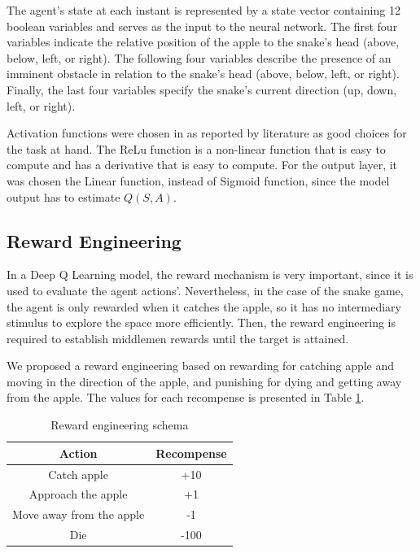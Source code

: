\documentclass[conference]{IEEEtran}
\begin{document}
The agent's state at each instant is represented by a state vector containing 12 boolean variables and serves as the input to the neural network. The first four variables indicate the relative position of the apple to the snake's head (above, below, left, or right). The following four variables describe the presence of an imminent obstacle in relation to the snake's head (above, below, left, or right). Finally, the last four variables specify the snake's current direction (up, down, left, or right). 

Activation functions were chosen in as reported by literature as good choices for the task at hand. The ReLu function is a non-linear function that is easy to compute and has a derivative that is easy to compute. For the output layer, it was chosen the Linear function, instead of Sigmoid function, since the model output has to estimate $Q(S,A)$.


\subsection{Reward Engineering}

In a Deep Q Learning model, the reward mechanism is very important, since it is used to evaluate the agent actions'. Nevertheless, in the case of the snake game, the agent is only rewarded when it catches the apple, so it has no intermediary stimulus to explore the space more efficiently. Then, the reward engineering is required to establish middlemen rewards until the target is attained.

We proposed a reward engineering based on rewarding for catching apple and moving in the direction of the apple, and punishing for dying and getting away from the apple. The values for each recompense is presented in Table \ref{tab:rewards}.

\begin{table}[h]
    \centering
    \label{tab:rewards}
    \caption{Reward engineering schema}
    \begin{tabular}{cc} 
        \toprule %
        Action & Recompense \\
        \midrule %
        Catch apple & +10\\
        Approach the apple & +1 \\
        Move away from the apple & -1 \\
        Die & -100\\
        \bottomrule %
    \end{tabular}
\end{table}
\end{document}
